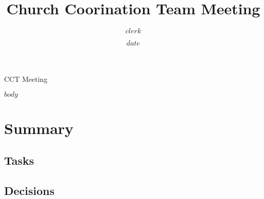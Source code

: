 \documentclass{article}
\title{Church Coorination Team Meeting}
\date{$date$}
\author{$clerk$}
\begin{document}
\begin{Minutes}{CCT Meeting}
\maketitle
$body$
\end{Minutes}

\section{Summary}

\subsection{Tasks}

\listoftasks

\subsection{Decisions}

\listofdecisions
\end{document}
